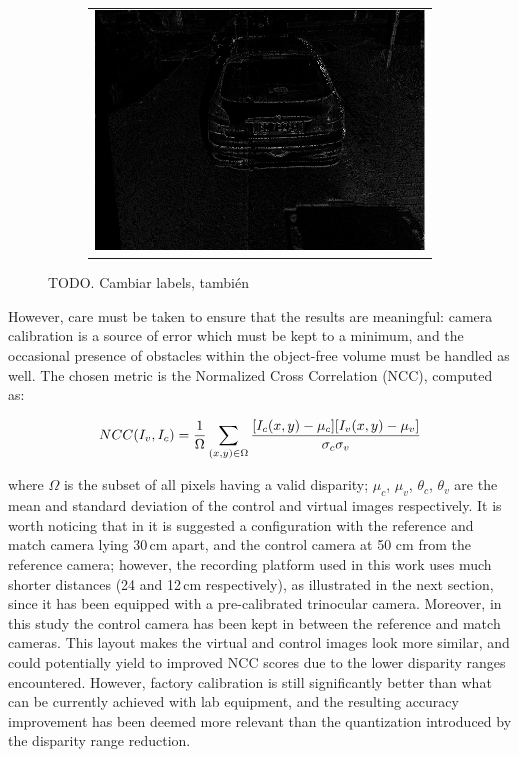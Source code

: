 \begin{figure}[h!]
        ~
        \begin{subfigure}[b]{0.3\textwidth}
	  \begin{tabular}{c}
	    \includegraphics[width=\textwidth]{ncc}
	  \end{tabular}
	  \caption{}\label{fig:cp03_lidarErrMap}
        \end{subfigure}%
        
        \caption{TODO. Cambiar labels, también}\label{fig:cp03_lidarGT}
\end{figure}

However, care must be taken to ensure that the results are meaningful: camera calibration is a source of error which must be kept to a minimum, and the occasional presence of obstacles within the object-free volume must be handled as well. The chosen metric is the Normalized Cross Correlation (NCC), computed as:

\begin{equation}\label{eq:cp03_NCC}
NCC(I_v,I_c) = {{{1} \over {\Omega}}  \sum_{(x,y) \in \Omega} {{[I_c(x,y)-\mu_c][I_v(x,y)-\mu_v]} \over {\sigma_c \sigma_v}}}
\end{equation}

where $\Omega$ is the subset of all pixels having a valid disparity; $\mu_c$, $\mu_v$, $\theta_c$, $\theta_v$ are the mean and standard deviation of the control and virtual images respectively.
It is worth noticing that in \cite{Morales2011} it is suggested a configuration with the reference and match camera lying 30\,cm apart, and the control camera at 50 cm from the reference camera; however, the recording platform used in this work uses much shorter distances (24 and 12\,cm respectively), as illustrated in the next section, since it has been equipped with a pre-calibrated trinocular camera. Moreover, in this study the control camera has been kept in between the reference and match cameras. This layout makes the virtual and control images look more similar, and could potentially yield to improved NCC scores due to the lower disparity ranges encountered. However, factory calibration is still significantly better than what can be currently achieved with lab equipment, and the resulting
accuracy improvement has been deemed more relevant than the quantization introduced by the disparity range reduction.


